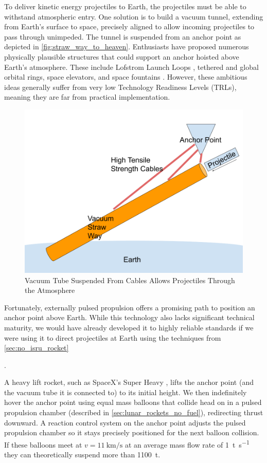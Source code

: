 \documentclass{article}
\begin{document}
{To deliver kinetic energy projectiles to Earth, the projectiles must be able to withstand atmospheric entry.  One solution is to build a vacuum tunnel, extending from Earth's surface to space, precisely aligned to allow incoming projectiles to pass through unimpeded.  The tunnel is suspended from an anchor point as depicted in \autoref{fig:straw_way_to_heaven}.   Enthusiasts have proposed numerous physically plausible structures that could support an anchor hoisted above Earth's atmosphere. These include Lofstrom Launch Loops \cite {lofstrom_loop}, tethered and global orbital rings, space elevators, and space fountains \cite{isaac_arthur_megastructure_complation}.  However, these ambitious ideas generally suffer from very low Technology Readiness Levels (TRLs), meaning they are far from practical implementation.

\begin{figure}[htpb]
    \centering
    \includegraphics[width=0.5\linewidth]{images/Straw Way To Heaven.png}
    \caption{Vacuum Tube Suspended From Cables Allows Projectiles Through the Atmosphere}
    \label{fig:straw_way_to_heaven}
\end{figure}


Fortunately, externally pulsed propulsion offers a promising path to position an anchor point above Earth. While this technology also lacks significant technical maturity, we would have already developed it to highly reliable standards if we were using it to direct projectiles at Earth using the techniques from \autoref{sec:no_isru_rocket}}.  

A heavy lift rocket, such as SpaceX's Super Heavy \cite{spacex_super_heavy}, lifts the anchor point (and the vacuum tube it is connected to) to its initial height.  We then indefinitely hover the anchor point using equal mass balloons that collide head on in a pulsed propulsion chamber (described in \autoref{sec:lunar_rockets_no_fuel}), redirecting thrust downward.  A reaction control system on the anchor point adjusts the pulsed propulsion chamber so it stays precisely positioned for the next balloon collision.  If these balloons meet at $v=\SI{11}{\kilo\meter\per\second}$ at an average mass flow rate of \SI{1}{\tonne\per\second} they can theoretically suspend more than \SI{1100}{\tonne}.   
\end{document}
